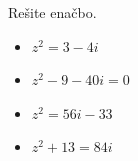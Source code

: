         

            \begin{naloga}
                Rešite enačbo.

                    \begin{itemize}
                        \item $ z^2=3-4i $ 
                        \item $ z^2-9-40i=0 $  
                        \item $ z^2=56i-33 $  
                        \item $ z^2+13=84i $  
                    \end{itemize}

                \end{naloga}

        

        

